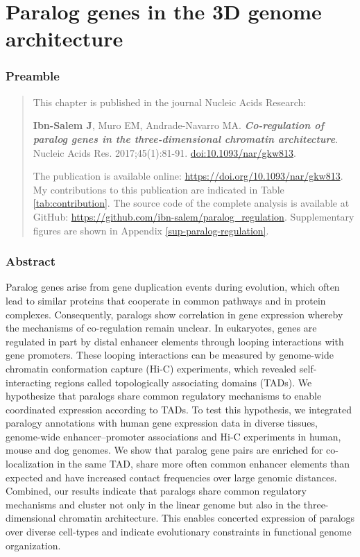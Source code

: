 \documentclass[a4paper,twoside=true,openright,parskip=full,chapterprefix=true,11pt,headings=normal,bibliography=totoc,listof=totoc,titlepage=on,captions=tableabove,draft=false]{scrreprt}
\theoremstyle{definition}
\theoremstyle{definition}
\theoremstyle{definition}
\theoremstyle{remark}
\begin{document}
\hypertarget{paralog-regulation}{%
\chapter{Paralog genes in the 3D genome
architecture}\label{paralog-regulation}}

\hypertarget{preamble}{%
\subsection*{Preamble}\label{preamble}}

\begin{quote}
This chapter is published in the journal Nucleic Acids Research:

\textbf{Ibn-Salem J}, Muro EM, Andrade-Navarro MA.
\textbf{\emph{Co-regulation of paralog genes in the three-dimensional
chromatin architecture}}. Nucleic Acids Res. 2017;45(1):81-91.
\href{https://doi.org/10.1093/nar/gkw813}{doi:10.1093/nar/gkw813}.

The publication is available online:
\url{https://doi.org/10.1093/nar/gkw813}. My contributions to this
publication are indicated in Table \ref{tab:contribution}. The source
code of the complete analysis is available at GitHub:
\url{https://github.com/ibn-salem/paralog_regulation}. Supplementary
figures are shown in Appendix \ref{sup-paralog-regulation}.
\end{quote}

\hypertarget{abstract-1}{%
\subsection*{Abstract}\label{abstract-1}}

Paralog genes arise from gene duplication events during evolution, which
often lead to similar proteins that cooperate in common pathways and in
protein complexes. Consequently, paralogs show correlation in gene
expression whereby the mechanisms of co-regulation remain unclear. In
eukaryotes, genes are regulated in part by distal enhancer elements
through looping interactions with gene promoters. These looping
interactions can be measured by genome-wide chromatin conformation
capture (Hi-C) experiments, which revealed self-interacting regions
called topologically associating domains (TADs). We hypothesize that
paralogs share common regulatory mechanisms to enable coordinated
expression according to TADs. To test this hypothesis, we integrated
paralogy annotations with human gene expression data in diverse tissues,
genome-wide enhancer--promoter associations and Hi-C experiments in
human, mouse and dog genomes. We show that paralog gene pairs are
enriched for co-localization in the same TAD, share more often common
enhancer elements than expected and have increased contact frequencies
over large genomic distances. Combined, our results indicate that
paralogs share common regulatory mechanisms and cluster not only in the
linear genome but also in the three-dimensional chromatin architecture.
This enables concerted expression of paralogs over diverse cell-types
and indicate evolutionary constraints in functional genome organization.
\end{document}
